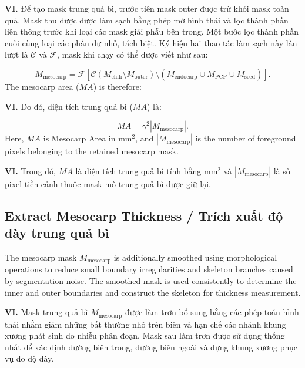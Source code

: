 \documentclass[final,1p,11pt,longtitle]{elsarticle}
\newenvironment{viet}{\par\smallskip\begingroup\color{viColor}\noindent\textbf{VI. }\ignorespaces}{\par\endgroup\smallskip}
\begin{document}
\begin{viet}
Để tạo mask trung quả bì, trước tiên mask outer được trừ khỏi mask toàn quả. Mask thu được được làm sạch bằng phép mở hình thái và lọc thành phần liên thông trước khi loại các mask giải phẫu bên trong. Một bước lọc thành phần cuối cùng loại các phần dư nhỏ, tách biệt. Ký hiệu hai thao tác làm sạch này lần lượt là $\mathcal{C}$ và $\mathcal{F}$, mask khi chạy có thể được viết như sau:
\end{viet}

\begin{equation}
 M_{\mathrm{mesocarp}}=\mathcal{F}\!\left[\mathcal{C}(M_{\mathrm{chili}}\setminus M_{\mathrm{outer}})\setminus\left(M_{\mathrm{endocarp}}\cup M_{\mathrm{PCP}}\cup M_{\mathrm{seed}}\right)\right].
\end{equation}
The mesocarp area ($MA$) is therefore:

\begin{viet}
Do đó, diện tích trung quả bì ($MA$) là:
\end{viet}

\begin{equation}
    MA=\gamma^2|M_{\mathrm{mesocarp}}|.
\end{equation}
Here, $MA$ is Mesocarp Area in mm$^2$, and $|M_{\mathrm{mesocarp}}|$ is the number of foreground pixels belonging to the retained mesocarp mask.

\begin{viet}
Trong đó, $MA$ là diện tích trung quả bì tính bằng mm$^2$ và $|M_{\mathrm{mesocarp}}|$ là số pixel tiền cảnh thuộc mask mô trung quả bì được giữ lại.
\end{viet}

\subsection*{Extract Mesocarp Thickness / {\color{viColor} Trích xuất độ dày trung quả bì}}

The mesocarp mask $M_{\mathrm{mesocarp}}$ is additionally smoothed using morphological operations to reduce small boundary irregularities and skeleton branches caused by segmentation noise. The smoothed mask is used consistently to determine the inner and outer boundaries and construct the skeleton for thickness measurement.

\begin{viet}
Mask trung quả bì $M_{\mathrm{mesocarp}}$ được làm trơn bổ sung bằng các phép toán hình thái nhằm giảm những bất thường nhỏ trên biên và hạn chế các nhánh khung xương phát sinh do nhiễu phân đoạn. Mask sau làm trơn được sử dụng thống nhất để xác định đường biên trong, đường biên ngoài và dựng khung xương phục vụ đo độ dày.
\end{viet}
\end{document}
